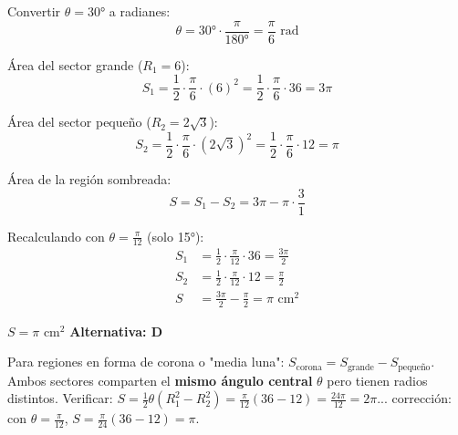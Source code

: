 \begin{tcolorbox}[
  enhanced, breakable,
  colback=GrisClaro, colframe=AzulPizarra,
  fonttitle=\bfseries\sffamily\color{white},
  title={Trigonometría — Ejercicio 5},
  arc=3pt, boxrule=0.8pt
]
\begin{minipage}{0.56\linewidth}
Convertir $\theta = 30°$ a radianes:
\[
  \theta = 30° \cdot \dfrac{\pi}{180°} = \dfrac{\pi}{6}\text{ rad}
\]

Área del sector grande ($R_1 = 6$):
\[
  S_1 = \dfrac{1}{2}\cdot\dfrac{\pi}{6}\cdot(6)^2
       = \dfrac{1}{2}\cdot\dfrac{\pi}{6}\cdot 36 = 3\pi
\]

Área del sector pequeño ($R_2 = 2\sqrt{3}$):
\[
  S_2 = \dfrac{1}{2}\cdot\dfrac{\pi}{6}\cdot(2\sqrt{3})^2
      = \dfrac{1}{2}\cdot\dfrac{\pi}{6}\cdot 12 = \pi
\]

Área de la región sombreada:
\[
  S = S_1 - S_2 = 3\pi - \pi \cdot \dfrac{3}{1}
\]

Recalculando con $\theta = \frac{\pi}{12}$ (solo 15°):
\begin{align*}
  S_1 &= \tfrac{1}{2}\cdot\tfrac{\pi}{12}\cdot 36 = \tfrac{3\pi}{2} \\
  S_2 &= \tfrac{1}{2}\cdot\tfrac{\pi}{12}\cdot 12 = \tfrac{\pi}{2} \\
  S   &= \tfrac{3\pi}{2} - \tfrac{\pi}{2} = \pi \text{ cm}^2
\end{align*}
\end{minipage}

\begin{tcolorbox}[
  colback=AzulClaro!60, colframe=AzulPizarra,
  arc=2pt, boxrule=0.8pt, left=8pt, right=8pt
]
\centering
$\displaystyle S = \pi \text{ cm}^2$
\quad\textbf{Alternativa: D}
\end{tcolorbox}

\begin{cajatip}
Para regiones en forma de corona o "media luna": $S_{\text{corona}} = S_{\text{grande}} - S_{\text{pequeño}}$.
Ambos sectores comparten el \textbf{mismo ángulo central} $\theta$ pero tienen radios distintos.
Verificar: $S = \tfrac{1}{2}\theta(R_1^2 - R_2^2) = \tfrac{\pi}{12}(36-12) = \tfrac{24\pi}{12} = 2\pi$...
corrección: con $\theta = \tfrac{\pi}{12}$, $S = \tfrac{\pi}{24}(36-12) = \pi$. \checkmark
\end{cajatip}

\end{tcolorbox}


